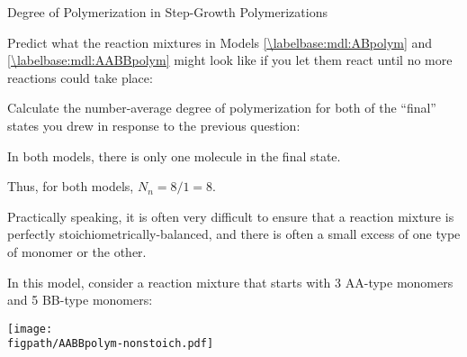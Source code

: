 \begin{activity}{Degree of Polymerization in Step-Growth Polymerizations}
\begin{ctqs}
		\question Predict what the reaction mixtures in Models \ref{\labelbase:mdl:ABpolym} and \ref{\labelbase:mdl:AABBpolym} might look like if you let them react until no more reactions could take place:
		
	\begin{solution}[2in]
	
	\end{solution}
		
		\question Calculate the number-average degree of polymerization for both of the ``final'' states you drew in response to the previous question:
		
		\begin{solution}[1in]
			In both models, there is only one molecule in the final state.
			
			Thus, for both models, $N_n = 8/1 = 8$.
		\end{solution}
\end{ctqs}

\begin{model}
\label{\labelbase:mdl:stoichimbalance}

Practically speaking, it is often very difficult to ensure that a reaction mixture is perfectly stoichiometrically-balanced, and there is often a small excess of one type of monomer or the other.

In this model, consider a reaction mixture that starts with 3 AA-type monomers and 5 BB-type monomers:

\vspace{0.1in}
\centerline{\texttt{[image: \\figpath/AABBpolym-nonstoich.pdf]}}

\end{model}

\begin{ctqs}


\end{ctqs}
\end{activity}
